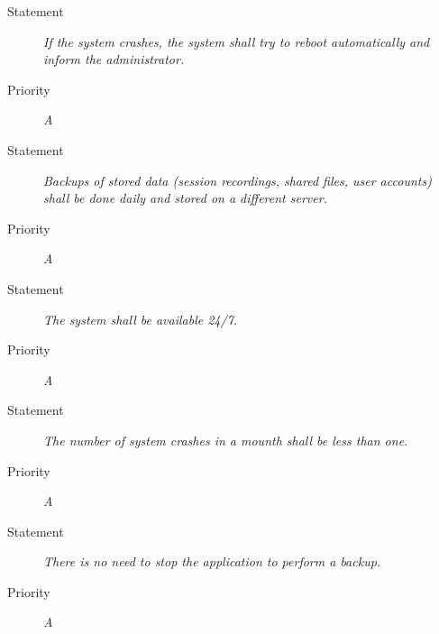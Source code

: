 \NFR
\begin{description}
\item [Statement] \textit{If the system crashes, the system shall try to reboot
    automatically and inform the administrator.}
\item [Priority] \textit{A}
\end{description}

\NFR
\begin{description}
\item [Statement] \textit{Backups of stored data (session recordings, shared
    files, user accounts) shall be done daily and stored on a different
    server.}
\item [Priority] \textit{A}
\end{description}

\NFR
\begin{description}
\item [Statement] \textit{The system shall be available 24/7.}
\item [Priority] \textit{A}
\end{description}

\NFR
\begin{description}
\item [Statement] \textit{The number of system crashes in a mounth shall
    be less than one.}
\item [Priority] \textit{A}
\end{description}

\NFR
\begin{description}
\item [Statement] \textit{There is no need to stop the application to perform
    a backup.}
\item [Priority] \textit{A}
\end{description}